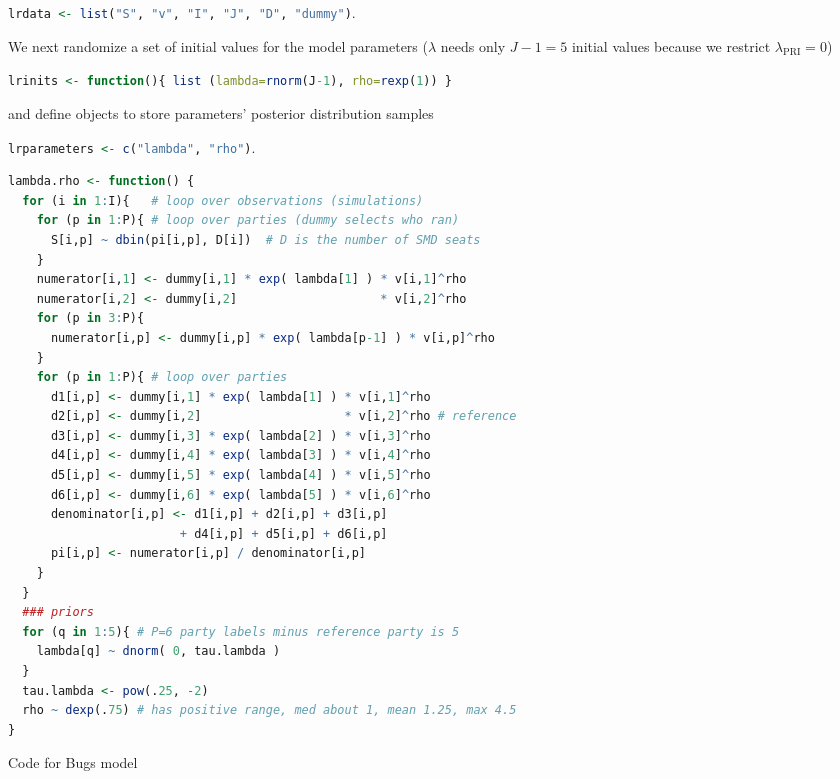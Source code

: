 \documentclass[letter,12pt]{article}
\begin{document}
\begin{center}
\lstinline[language=R]!lrdata <- list("S", "v", "I", "J", "D", "dummy")!.
\end{center}

\noindent We next randomize a set of initial values for the model parameters ($\lambda$ needs only $J-1=5$ initial values because we restrict $\lambda_{\text{PRI}}=0$)

\begin{center}
\lstinline[language=R]!lrinits <- function(){ list (lambda=rnorm(J-1), rho=rexp(1)) }!
\end{center}

\noindent and define objects to store  parameters' posterior distribution samples

\begin{center}
\lstinline[language=R]!lrparameters <- c("lambda", "rho")!.
\end{center}

\lstset{style=mystyle}
\begin{table}
\centering
{}
\begin{lstlisting}[language=R]
lambda.rho <- function() {
  for (i in 1:I){   # loop over observations (simulations)
    for (p in 1:P){ # loop over parties (dummy selects who ran)
      S[i,p] ~ dbin(pi[i,p], D[i])  # D is the number of SMD seats
    }
    numerator[i,1] <- dummy[i,1] * exp( lambda[1] ) * v[i,1]^rho
    numerator[i,2] <- dummy[i,2]                    * v[i,2]^rho
    for (p in 3:P){
      numerator[i,p] <- dummy[i,p] * exp( lambda[p-1] ) * v[i,p]^rho
    }
    for (p in 1:P){ # loop over parties
      d1[i,p] <- dummy[i,1] * exp( lambda[1] ) * v[i,1]^rho 
      d2[i,p] <- dummy[i,2]                    * v[i,2]^rho # reference
      d3[i,p] <- dummy[i,3] * exp( lambda[2] ) * v[i,3]^rho 
      d4[i,p] <- dummy[i,4] * exp( lambda[3] ) * v[i,4]^rho 
      d5[i,p] <- dummy[i,5] * exp( lambda[4] ) * v[i,5]^rho 
      d6[i,p] <- dummy[i,6] * exp( lambda[5] ) * v[i,6]^rho 
      denominator[i,p] <- d1[i,p] + d2[i,p] + d3[i,p] 
                        + d4[i,p] + d5[i,p] + d6[i,p]
      pi[i,p] <- numerator[i,p] / denominator[i,p]
    }
  }
  ### priors
  for (q in 1:5){ # P=6 party labels minus reference party is 5
    lambda[q] ~ dnorm( 0, tau.lambda )
  }
  tau.lambda <- pow(.25, -2)
  rho ~ dexp(.75) # has positive range, med about 1, mean 1.25, max 4.5
}
\end{lstlisting}
\caption{Code for Bugs model}\label{T:bugsCode}
\end{table}
\end{document}
